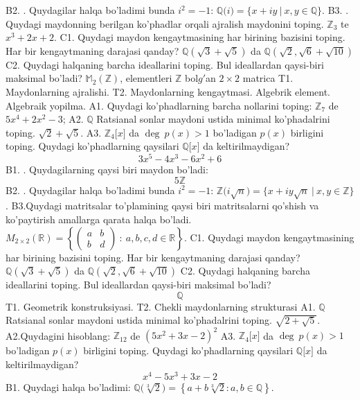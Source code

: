 B2. . Quydagilar halqa bo'ladimi bunda \(i^{2} = - 1\):
\(\mathbb{Q(}i) = \{ x + iy\ |\ x,y \in \mathbb{Q\}}\).
B3. . Quydagi maydonning berilgan ko'phadlar orqali ajralish maydonini toping.
\(\mathbb{Z}_{3}\) te \(x^{3} + 2x + 2\).
C1. Quydagi maydon kengaytmasining har birining bazisini toping. Har bir kengaytmaning darajasi qanday?
\(\mathbb{Q}\left( \sqrt{3} + \sqrt{5} \right)\) da \(\mathbb{Q}\left( \sqrt{2},\sqrt{6} + \sqrt{10} \right)\)
C2. Quydagi halqaning barcha ideallarini toping. Bul ideallardan qaysi-biri maksimal bo'ladi?
\(\mathbb{M}_{2}\left( \mathbb{Z} \right)\), elementleri \(\mathbb{Z}\) bol\(g'\)an \(2 \times 2\) matrica
T1. Maydonlarning ajralishi.
T2. Maydonlarning kengaytmasi. Algebrik element. Algebraik yopilma.
A1. Quydagi ko'phadlarning barcha nollarini toping:
\(\mathbb{Z}_{7}\) de \(5x^{4} + 2x^{2} - 3\);
A2. \(\mathbb{Q}\) Ratsianal sonlar maydoni ustida minimal ko'phadalrini toping.
\(\sqrt{2} + \sqrt{5}\).
A3. \(\mathbb{Z}_{4}\lbrack x\rbrack\) da \(\deg\ p(x) > 1\) bo'ladigan \(p(x)\) birligini toping. Quydagi ko'phadlarning qaysilari \(\mathbb{Q\lbrack}x\rbrack\) da keltirilmaydigan?
\[3x^{5} - 4x^{3} - 6x^{2} + 6\]
B1. . Quydagilarning qaysi biri maydon bo'ladi:
\[5\mathbb{Z}\]
B2. . Quydagilar halqa bo'ladimi bunda \(i^{2} = - 1\):
\(\mathbb{Z(}i\sqrt{n}) = \{ x + iy\sqrt{n}\ |\ x,y \in \mathbb{Z\}}\).
B3.Quydagi matritsalar to'plamining qaysi biri matritsalarni qo'shish va ko'paytirish amallarga qarata halqa bo'ladi.
\(M_{2 \times 2}\mathbb{(R) =}\left\{ \begin{pmatrix}
a & b \\
b & d
\end{pmatrix}\ :\ a,b,c,d \in \mathbb{R} \right\}\).
C1. Quydagi maydon kengaytmasining har birining bazisini toping. Har bir kengaytmaning darajasi qanday?
\(\mathbb{Q}\left( \sqrt{3} + \sqrt{5} \right)\) da \(\mathbb{Q}\left( \sqrt{2},\sqrt{6} + \sqrt{10} \right)\)
C2. Quydagi halqaning barcha ideallarini toping. Bul ideallardan qaysi-biri maksimal bo'ladi?
\[\mathbb{Q}\]
T1. Geometrik konstruksiyasi.
T2. Chekli maydonlarning strukturasi
A1. \(\mathbb{Q}\) Ratsianal sonlar maydoni ustida minimal ko'phadalrini toping.
\(\sqrt{2 + \sqrt{5}}\).
A2.Quydagini hisoblang:
\(\mathbb{Z}_{12}\) de \(\left( 5x^{2} + 3x - 2 \right)^{2}\)
A3. \(\mathbb{Z}_{4}\lbrack x\rbrack\) da \(\deg\ p(x) > 1\) bo'ladigan \(p(x)\) birligini toping. Quydagi ko'phadlarning qaysilari \(\mathbb{Q\lbrack}x\rbrack\) da keltirilmaydigan?
\[x^{4} - 5x^{3} + 3x - 2\]
B1. Quydagi halqa bo'ladimi:
\(\mathbb{Q(}\sqrt[3]{2}) = \left\{ a + b\sqrt[3]{2}:a,b \in \mathbb{Q} \right\}\).
